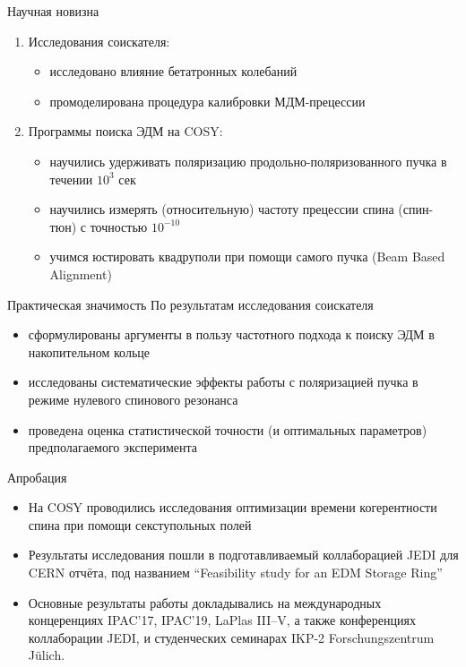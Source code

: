 \documentclass[14pt]{beamer}
\begin{document}
\begin{frame}{Научная новизна}
\begin{enumerate}
	\item Исследования соискателя: 
	\begin{itemize}
		\item исследовано влияние бетатронных колебаний
		\item промоделирована процедура калибровки МДМ-прецессии
	\end{itemize}
	\item Программы поиска ЭДМ на COSY: 
	\begin{itemize}
		\item научились удерживать поляризацию продольно-поляризованного пучка в течении $10^3$ сек
		\item научились измерять (относительную) частоту прецессии спина (спин-тюн) с точностью $10^{-10}$
		\item учимся юстировать квадруполи при помощи самого пучка (Beam Based Alignment)
	\end{itemize}
\end{enumerate}
\end{frame}

\begin{frame}{Практическая значимость}
По результатам исследования соискателя
\begin{itemize}
\item сформулированы аргументы в пользу частотного подхода к поиску ЭДМ в накопительном кольце
\item исследованы систематические эффекты работы с поляризацией пучка в режиме нулевого спинового резонанса
\item проведена оценка статистической точности (и оптимальных параметров) предполагаемого эксперимента
\end{itemize}
\end{frame}

\begin{frame}{Апробация}
\begin{itemize}
\item На COSY проводились исследования оптимизации времени когерентности спина при помощи секступольных полей
\item Результаты исследования пошли в подготавливаемый коллаборацией JEDI для CERN отчёта, под названием ``Feasibility study for an EDM Storage Ring''
\item Основные результаты работы докладывались на международных концеренциях IPAC'17, IPAC'19, LaPlas III--V, а также конференциях коллаборации JEDI, и студенческих семинарах IKP-2 Forschungszentrum J\"ulich.
\end{itemize}
\end{frame}
\end{document}

